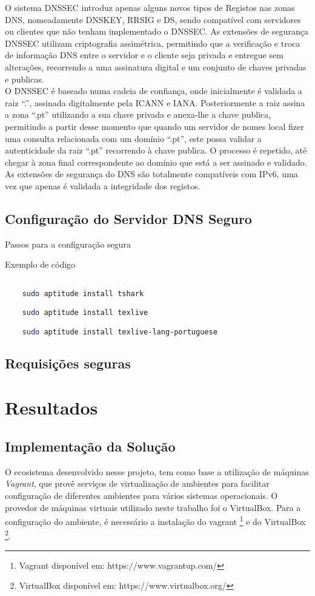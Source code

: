 \documentclass[12pt,openright,a4paper]{report}
\begin{document}
{O sistema DNSSEC introduz apenas alguns novos tipos de Registos nas zonas DNS, nomeadamente DNSKEY, RRSIG e DS, sendo compatível com servidores ou clientes que não tenham implementado o DNSSEC. As extensões de segurança DNSSEC utilizam criptografia assimétrica, permitindo que a verificação e troca de informação DNS entre o servidor e o cliente seja privada e entregue sem alterações, recorrendo a uma assinatura digital e um conjunto de chaves privadas e publicas.\\

O DNSSEC é baseado numa cadeia de confiança, onde inicialmente é validada a raiz “.”, assinada digitalmente pela ICANN e IANA. Posteriormente a raiz assina a zona “.pt” utilizando a sua chave privada e anexa-lhe a chave publica, permitindo a partir desse momento que quando um servidor de nomes local fizer uma consulta relacionada com um domínio “.pt”, este possa validar a autenticidade da raiz “.pt” recorrendo à chave publica. O processo é repetido, até chegar à zona final correspondente ao domínio que está a ser assinado e validado. As extensões de segurança do DNS são totalmente compatíveis com IPv6, uma vez que apenas é validada a integridade dos registos.

\section{Configuração do Servidor DNS Seguro}
\label{sec_config_segura}

Passos para a configuração segura

Exemplo de código
\begin{lstlisting}[language=bash]

	sudo aptitude install tshark

	sudo aptitude install texlive

	sudo aptitude install texlive-lang-portuguese

\end{lstlisting}

\section{Requisições seguras}
\label{sec_req_seguras}




\chapter{Resultados}

\section{Implementação da Solução}
O ecosistema desenvolvido nesse projeto, tem como base a utilização de máquinas \textit{Vagrant}, que provê serviços de virtualização de ambientes para facilitar configuração de diferentes ambientes para vários sistemas operacionais. O provedor de máquinas virtuais utilizado neste trabalho foi o VirtualBox. Para a configuração do ambiente, é necessário a instalação do vagrant \footnote{Vagrant disponível em: https://www.vagrantup.com/} e do VirtualBox \footnote{VirtualBox disponível em: https://www.virtualbox.org/}.\\

}
\end{document}
